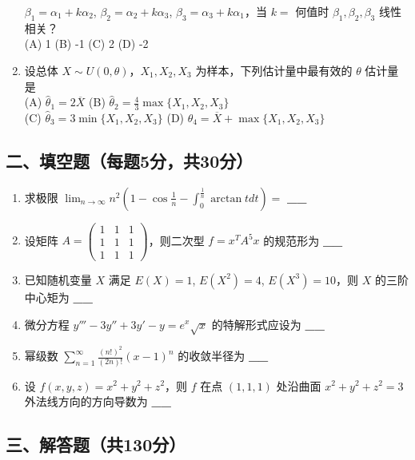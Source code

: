 \documentclass[UTF8]{ctexart}
\begin{document}
\begin{enumerate}
  \( \beta_1 = \alpha_1 + k\alpha_2 \),
  \( \beta_2 = \alpha_2 + k\alpha_3 \),
  \( \beta_3 = \alpha_3 + k\alpha_1 \)，当 \( k = \) 何值时
  \( \beta_1, \beta_2, \beta_3 \) 线性相关？\\
  (A) 1 (B) -1 (C) 2 (D) -2
\item
  设总体 \( X \sim U(0, \theta) \)，\( X_1, X_2, X_3 \)
  为样本，下列估计量中最有效的 \( \theta \) 估计量是\\
  (A) \( \hat{\theta}_1 = 2\overline{X} \) (B)
  \( \hat{\theta}_2 = \frac{4}{3} \max\{X_1,X_2,X_3\} \)\\
  (C) \( \hat{\theta}_3 = 3\min\{X_1,X_2,X_3\} \) (D)
  \( \hat{\theta}_4 = \overline{X} + \max\{X_1,X_2,X_3\} \)
\end{enumerate}

\subsection{二、填空题（每题5分，共30分）}\label{ux4e8cux586bux7a7aux9898ux6bcfux98985ux5206ux517130ux5206uxff09}

\begin{enumerate}
\def\labelenumi{\arabic{enumi}.}
\item
  求极限
  \( \lim_{n \to \infty} n^2 \left(1 - \cos\frac{1}{n} - \int_0^{\frac{1}{n}} \arctan t dt\right) = \)
  \textbf{\_\_}
\item
  设矩阵 \( A = \begin{pmatrix} 
  1 & 1 & 1 \\
  1 & 1 & 1 \\
  1 & 1 & 1 
  \end{pmatrix} \)，则二次型 \( f = x^T A^5 x \) 的规范形为
  \textbf{\_\_}
\item
  已知随机变量 \( X \) 满足 \( E(X) = 1 \), \( E(X^2) = 4 \),
  \( E(X^3) = 10 \)，则 \( X \) 的三阶中心矩为 \textbf{\_\_}
\item
  微分方程 \( y''' - 3y'' + 3y' - y = e^x \sqrt{x} \) 的特解形式应设为
  \textbf{\_\_}
\item
  幂级数 \( \sum_{n=1}^{\infty} \frac{(n!)^2}{(2n)!} (x-1)^n \)
  的收敛半径为 \textbf{\_\_}
\item
  设 \( f(x,y,z) = x^2 + y^2 + z^2 \)，则 \( f \) 在点 \( (1,1,1) \)
  处沿曲面 \( x^2 + y^2 + z^2 = 3 \) 外法线方向的方向导数为
  \textbf{\_\_}
\end{enumerate}

\subsection{三、解答题（共130分）}\label{ux4e09ux89e3ux7b54ux9898ux5171130ux5206uxff09}
\end{document}
